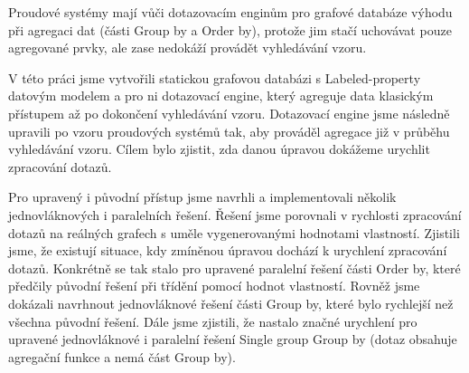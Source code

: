 \documentclass[12pt]{report}
\begin{document}
Proudové systémy mají vůči dotazovacím enginům pro grafové databáze výhodu při agregaci dat (části Group by a Order by), protože jim stačí uchovávat pouze agregované prvky, ale zase nedokáží provádět vyhledávání vzoru.

V této práci jsme vytvořili statickou grafovou databázi s Labeled-property datovým modelem a pro ni dotazovací engine, který agreguje data klasickým přístupem až po dokončení vyhledávání vzoru.
Dotazovací engine jsme následně upravili po vzoru proudových systémů tak, aby prováděl agregace již v průběhu vyhledávání vzoru.
Cílem bylo zjistit, zda danou úpravou dokážeme urychlit zpracování dotazů.

Pro upravený i původní přístup jsme navrhli a implementovali několik jednovláknových i paralelních řešení.
Řešení jsme porovnali v rychlosti zpracování dotazů na reálných grafech s uměle vygenerovanými hodnotami vlastností.
Zjistili jsme, že existují situace, kdy zmíněnou úpravou dochází k urychlení zpracování dotazů.
Konkrétně se tak stalo pro upravené paralelní řešení části Order by, které předčily původní řešení při třídění pomocí hodnot vlastností.
Rovněž jsme dokázali navrhnout jednovláknové řešení části Group by, které bylo rychlejší než všechna původní řešení. 
Dále jsme zjistili, že nastalo značné urychlení pro upravené jednovláknové i paralelní řešení Single group Group by (dotaz obsahuje agregační funkce a nemá část Group by).
\end{document}
